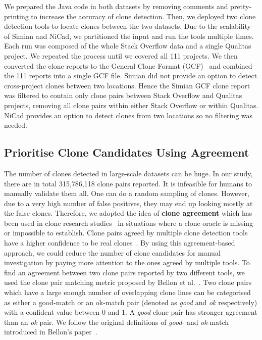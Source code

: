 \documentclass[sigconf,review, anonymous]{acmart}
\begin{document}
We prepared the Java code in both datasets by removing comments and
pretty-printing to increase the accuracy of clone detection. Then, we
deployed two clone detection tools to locate clones between the two datasets.
Due to the scalability of Simian and NiCad, we partitioned the input
and run the tools multiple times. Each run was composed of the whole
Stack Overflow data and a single Qualitas project. We repeated the
process until we covered all 111 projects.
We then converted the clone reports to the General Clone Format
(GCF)~\cite{Wang2013} and combined the 111 reports into a single GCF
file.
Simian did not provide an option to detect cross-project clones
between two locations. Hence the Simian GCF clone report was filtered
to contain only clone pairs between Stack Overflow and Qualitas
projects, removing all clone pairs within either Stack Overflow or
within Qualitas. NiCad provides an option to detect clones from two
locations so no filtering was needed. 

\subsection{Prioritise Clone Candidates Using Agreement}
The number of clones detected in large-scale datasets can be huge. In our study, there are in total 315,786,118 clone pairs reported. It is infeasible for humans to manually validate them all. One can do a random sampling of clones. However, due to a very high number of false positives, they may end up looking mostly at the false clones. Therefore, we adopted the idea of \textbf{clone agreement} which has been used in clone research studies~\cite{Wang2013,Funaro2010,cr2016ssbse} in situations where a clone oracle is missing or impossible to establish. Clone pairs agreed by multiple clone detection tools have a higher confidence to be real clones~\cite{cr2016ssbse}. By using this agreement-based approach, we could reduce the number of clone candidates for manual investigation by paying more attention to the ones agreed by multiple tools. To find an agreement between two clone pairs reported by two different tools, we used the clone pair matching metric proposed by Bellon et al.~\cite{Bellon2007}. Two clone pairs which have a large enough number of overlapping clone lines can be categorised as either a good-match or an ok-match pair (denoted as \textit{good} and \textit{ok} respectively) with a confident value between 0 and 1. A \textit{good} clone pair has stronger agreement than an \textit{ok} pair. We follow the original definitions of \textit{good}- and \textit{ok}-match introduced in Bellon's paper~\cite{Bellon2007}.
\end{document}
